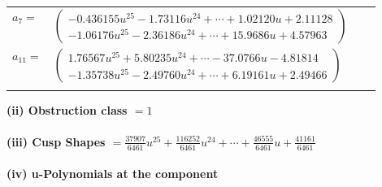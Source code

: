 \documentclass[1p]{elsarticle_modified}
\theoremstyle{definition}
\begin{document}
\begin{tabular}{m{7pt} m{180pt} m{7pt} m{180pt} }
\flushright $a_{7}=$&$\begin{pmatrix}-0.436155 u^{25}-1.73116 u^{24}+\cdots+1.02120 u+2.11128\\-1.06176 u^{25}-2.36186 u^{24}+\cdots+15.9686 u+4.57963\end{pmatrix}$ \\
\flushright $a_{11}=$&$\begin{pmatrix}1.76567 u^{25}+5.80235 u^{24}+\cdots-37.0766 u-4.81814\\-1.35738 u^{25}-2.49760 u^{24}+\cdots+6.19161 u+2.49466\end{pmatrix}$\\&\end{tabular}
\flushleft \textbf{(ii) Obstruction class $= 1$}\\~\\
\flushleft \textbf{(iii) Cusp Shapes $= \frac{37907}{6461} u^{25}+\frac{116252}{6461} u^{24}+\cdots+\frac{46555}{6461} u+\frac{41161}{6461}$}\\~\\
\newpage\renewcommand{\arraystretch}{1}
\flushleft \textbf{(iv) u-Polynomials at the component}\newline \\
\end{document}
